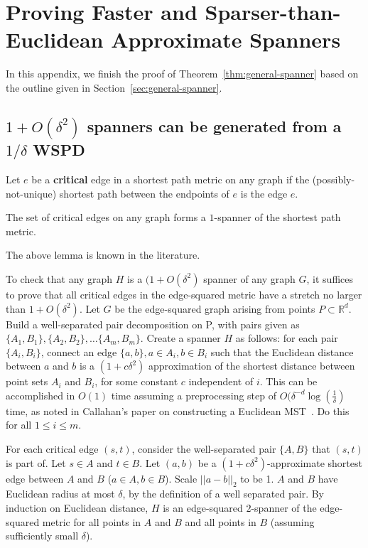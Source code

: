 \section{Proving Faster and Sparser-than-Euclidean Approximate
  Spanners}\label{ap:general-spanner}
In this appendix, we finish the proof of
Theorem~\ref{thm:general-spanner} based on the outline given in
Section~\ref{sec:general-spanner}.

\subsection{$1+O(\delta^2)$ spanners can be generated from a
$1/\delta$ WSPD}

\begin{definition}\label{def:critical} Let $e$ be a \textbf{critical} edge in a
  shortest path metric on any graph if the
  (possibly-not-unique) shortest path between the endpoints of $e$ is the edge $e$.
\end{definition}
\begin{lemma} The set of critical edges on any graph forms a $1$-spanner of the
shortest path metric. \end{lemma}
The above lemma is known in the literature.

To check that any graph $H$ is a $(1+O(\delta^2)$ spanner of any graph $G$, it suffices
to prove that all critical edges in the edge-squared metric have a stretch
no larger than $1+O( \delta^2)$.
Let $G$ be the edge-squared graph arising from points $P \subset \mathbb{R}^d$. Build a well-separated pair decomposition on P, with pairs given as $\{A_1, B_1\}, \{A_2, B_2\}, \ldots \{A_m, B_m\}$.
Create a spanner $H$ as follows: for each pair $\{A_i, B_i\}$, connect
an edge $\{a, b\}, a\in A_i, b\in B_i$ such that the Euclidean distance
between $a$ and $b$ is a $(1+c\delta^2)$ approximation of the shortest distance
between point sets $A_i$ and $B_i$, for some constant $c$ independent of
$i$. This can be accomplished in $O(1)$ time assuming a preprocessing
step of $O(\delta^{-d} \log\left(\frac{1}{\delta}\right)$ time, as noted
in Callahan's paper on constructing a Euclidean MST~\cite{Callahan1995}. Do this for all $ 1 \leq i \leq m$.

For each critical edge $(s,t)$, consider the well-separated pair $\{A, B\}$ that $(s,t)$ is part of. Let $ s\in A$ and $t \in B$. Let $(a,b)$ be a $(1+c\delta^2)$-approximate shortest edge between $A$ and $B$ ($a \in A, b\in B$).
Scale $||a-b||_2$ to be 1. $A$ and $B$ have Euclidean radius at most
$\delta$, by the definition of a well separated pair. By induction on
Euclidean distance, $H$ is an edge-squared $2$-spanner of the
edge-squared metric for all points in $A$ and $B$ and all points in $B$
(assuming sufficiently small $\delta$).

